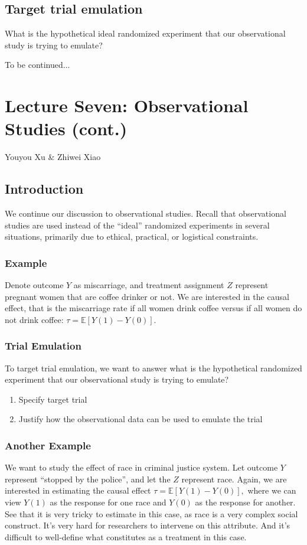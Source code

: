 \subsection{Target trial emulation}
What is the hypothetical ideal randomized experiment that our observational study is trying to emulate?

To be continued...




\section{Lecture Seven: Observational Studies (cont.)}{Youyou Xu \& Zhiwei Xiao}

\subsection{Introduction}

We continue our discussion to observational studies. Recall that observational studies are used instead of the ``ideal'' randomized experiments in several situations, primarily due to ethical, practical, or logistical constraints. 

\subsubsection{Example}
Denote outcome $Y$ as miscarriage, and treatment assignment $Z$ represent pregnant women that are coffee drinker or not. We are interested in the causal effect, that is the miscarriage rate if all women drink coffee versus if all women do not drink coffee: $\tau = \mathbb{E}[Y(1)-Y(0)].$

\subsubsection{Trial Emulation}
To target trial emulation, we want to answer what is the hypothetical randomized experiment that our observational study is trying to emulate?

\begin{enumerate}[label=\textbf{\arabic*}]
        \item Specify target trial
        \item Justify how the observational data can be used to emulate the trial
\end{enumerate}


\subsubsection{Another Example}
We want to study the effect of race in criminal justice system. Let outcome $Y$ represent ``stopped by the police'', and let the $Z$ represent race. Again, we are interested in estimating the causal effect $\tau = \mathbb{E}[Y(1)-Y(0)],$ where we can view $Y(1)$ as the response for one race and $Y(0)$ as the response for another. See that it is very tricky to estimate in this case, as race is a very complex social construct. It's very hard for researchers to intervene on this attribute. And it's difficult to well-define what constitutes as a treatment in this case. 

